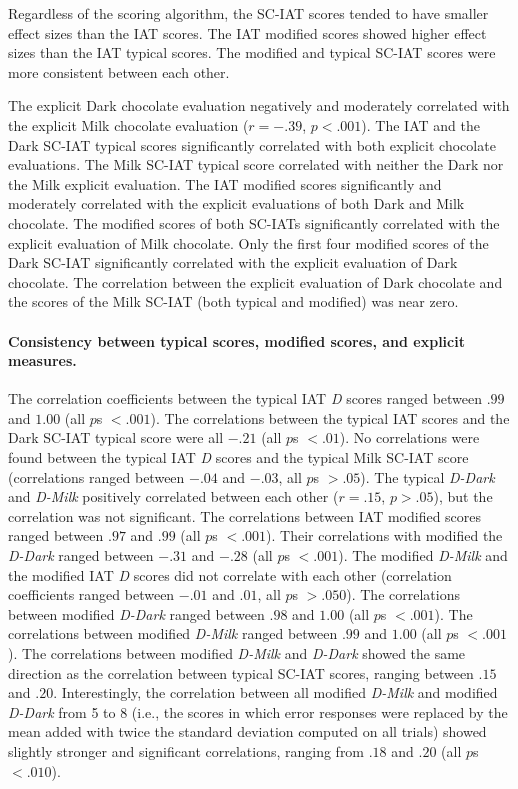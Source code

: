 \documentclass[12pt]{book}
\begin{document}
Regardless of the scoring algorithm, the SC-IAT scores tended to have smaller effect sizes than the IAT scores.
The IAT modified scores showed higher effect sizes than the IAT typical scores. The modified and typical SC-IAT scores were more consistent between each other. 

The explicit Dark chocolate evaluation negatively and moderately correlated with the explicit Milk chocolate evaluation ($r = -.39$, $p < .001$). The IAT and the Dark SC-IAT typical scores significantly correlated with both explicit chocolate evaluations. 
The Milk SC-IAT typical score correlated with neither the Dark nor the Milk explicit evaluation. The IAT modified scores significantly and moderately correlated with the explicit evaluations of both Dark and Milk chocolate.
The modified scores of both SC-IATs significantly correlated with the explicit evaluation of Milk chocolate. Only the first four modified scores of the Dark SC-IAT significantly correlated with the explicit evaluation of Dark chocolate. 
The correlation between the explicit evaluation of Dark chocolate and the scores of the Milk SC-IAT (both typical and modified) was near zero. 

\paragraph{Consistency between typical scores, modified scores, and explicit measures.}

The correlation coefficients between the typical IAT \emph{D} scores ranged between $.99$ and $1.00$ (all $p$s $< .001$). The correlations between the typical IAT scores and the Dark SC-IAT typical score were all $-.21$ (all $p$s $<.01$). 
No correlations were found between the typical IAT \emph{D} scores and the typical Milk SC-IAT score (correlations ranged between $-.04$ and $-.03$, all $p$s $>.05$). The typical \emph{D-Dark} and \emph{D-Milk} positively correlated between each other ($r = .15$, $p > .05$), but the correlation was not significant. 
The correlations between IAT modified scores ranged between $.97$ and $.99$ (all $p$s $< .001$). 
Their correlations with modified the \emph{D-Dark} ranged between $-.31$ and $-.28$ (all $p$s $<.001$). 
The modified \emph{D-Milk} and the modified IAT \emph{D} scores did not correlate with each other (correlation coefficients ranged between $-.01$ and $.01$, all $p$s $> .050$). 
The correlations between modified \emph{D-Dark} ranged between $.98$ and $1.00$ (all $p$s $<.001$). The correlations between modified \emph{D-Milk} ranged between $.99$ and $1.00$ (all $p$s $<.001$). The correlations between modified \emph{D-Milk} and \emph{D-Dark} showed the same direction as the correlation between typical SC-IAT scores, ranging between $.15$ and $.20$. 
Interestingly, the correlation between all modified \emph{D-Milk} and modified \emph{D-Dark} from 5 to 8 (i.e., the scores in which  error responses were replaced by the mean added with twice the standard deviation computed on all trials) showed slightly stronger and significant correlations, ranging from $.18$ and $.20$ (all $p$s $<.010$). 
\end{document}
